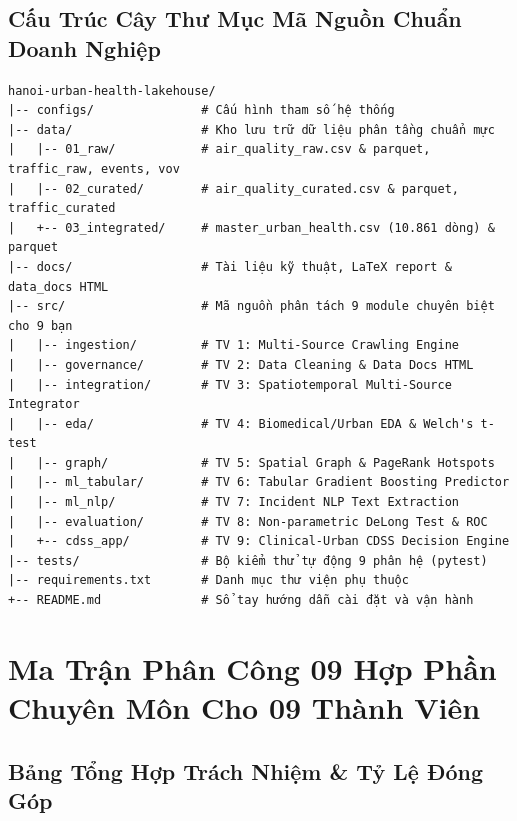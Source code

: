 \documentclass[11pt,a4paper]{article}
\begin{document}
\subsection{Cấu Trúc Cây Thư Mục Mã Nguồn Chuẩn Doanh Nghiệp}
\begin{verbatim}
hanoi-urban-health-lakehouse/
|-- configs/               # Cấu hình tham số hệ thống
|-- data/                  # Kho lưu trữ dữ liệu phân tầng chuẩn mực
|   |-- 01_raw/            # air_quality_raw.csv & parquet, traffic_raw, events, vov
|   |-- 02_curated/        # air_quality_curated.csv & parquet, traffic_curated
|   +-- 03_integrated/     # master_urban_health.csv (10.861 dòng) & parquet
|-- docs/                  # Tài liệu kỹ thuật, LaTeX report & data_docs HTML
|-- src/                   # Mã nguồn phân tách 9 module chuyên biệt cho 9 bạn
|   |-- ingestion/         # TV 1: Multi-Source Crawling Engine
|   |-- governance/        # TV 2: Data Cleaning & Data Docs HTML
|   |-- integration/       # TV 3: Spatiotemporal Multi-Source Integrator
|   |-- eda/               # TV 4: Biomedical/Urban EDA & Welch's t-test
|   |-- graph/             # TV 5: Spatial Graph & PageRank Hotspots
|   |-- ml_tabular/        # TV 6: Tabular Gradient Boosting Predictor
|   |-- ml_nlp/            # TV 7: Incident NLP Text Extraction
|   |-- evaluation/        # TV 8: Non-parametric DeLong Test & ROC
|   +-- cdss_app/          # TV 9: Clinical-Urban CDSS Decision Engine
|-- tests/                 # Bộ kiểm thử tự động 9 phân hệ (pytest)
|-- requirements.txt       # Danh mục thư viện phụ thuộc
+-- README.md              # Sổ tay hướng dẫn cài đặt và vận hành
\end{verbatim}

\section{Ma Trận Phân Công 09 Hợp Phần Chuyên Môn Cho 09 Thành Viên}

\subsection{Bảng Tổng Hợp Trách Nhiệm \& Tỷ Lệ Đóng Góp}
\end{document}
